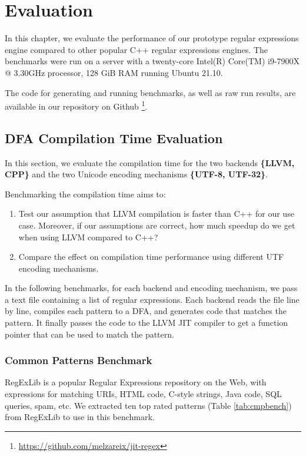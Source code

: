 \chapter{Evaluation}\label{chapter:evaluation}
In this chapter, we evaluate the performance of our prototype regular expressions engine compared to other popular C++ regular expressions engines. The benchmarks were run on a server with a twenty-core Intel(R) Core(TM) i9-7900X @ 3.30GHz processor, 128 GiB RAM running Ubuntu 21.10.

The code for generating and running benchmarks, as well as raw run results, are available in our repository on Github \footnote{\url{https://github.com/melzareix/jit-regex}}.

\newcommand\rownumberone{\stepcounter{magicrownumbers1}\arabic{magicrownumbers1}}
\newcommand\rownumbertwo{\stepcounter{magicrownumbers2}\arabic{magicrownumbers2}}
\newcommand\rownumberthree{\stepcounter{magicrownumbers3}\arabic{magicrownumbers3}}

\section{DFA Compilation Time Evaluation}
In this section, we evaluate the compilation time for the two backends \textbf{\{LLVM, CPP\}} and the two Unicode encoding mechanisms \textbf{\{UTF-8, UTF-32\}}.

Benchmarking the compilation time aims to:
\begin{enumerate}
    \item Test our assumption that LLVM compilation is faster than C++ for our use case. Moreover, if our assumptions are correct, how much speedup do we get when using LLVM compared to C++?
    \item Compare the effect on compilation time performance using different UTF encoding mechanisms.
\end{enumerate}

In the following benchmarks, for each backend and encoding mechanism, we pass a text file containing a list of regular expressions. Each backend reads the file line by line, compiles each pattern to a DFA, and generates code that matches the pattern. It finally passes the code to the LLVM JIT compiler to get a function pointer that can be used to match the pattern.

\subsection{Common Patterns Benchmark}\label{cmnpatt}
RegExLib \cite{regexlib} is a popular Regular Expressions repository on the Web, with expressions for matching URIs, HTML code, C-style strings, Java code, SQL queries, spam, etc. We extracted ten top rated patterns (Table \ref{tab:cmpbench}) from RegExLib to use in this benchmark.

